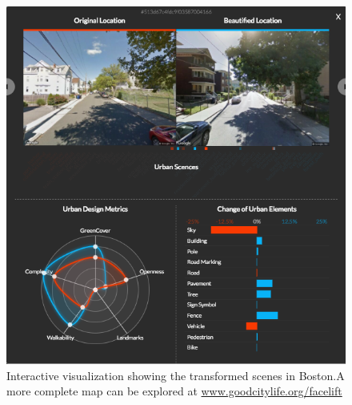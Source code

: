 

\begin{figure}[t!]
    \centering
    \includegraphics[width=\columnwidth]{UI.png}
    \caption{Interactive visualization showing the transformed scenes in Boston.A more complete map can be explored at \url{www.goodcitylife.org/facelift}}
    \label{facelift-UI}
\end{figure}


